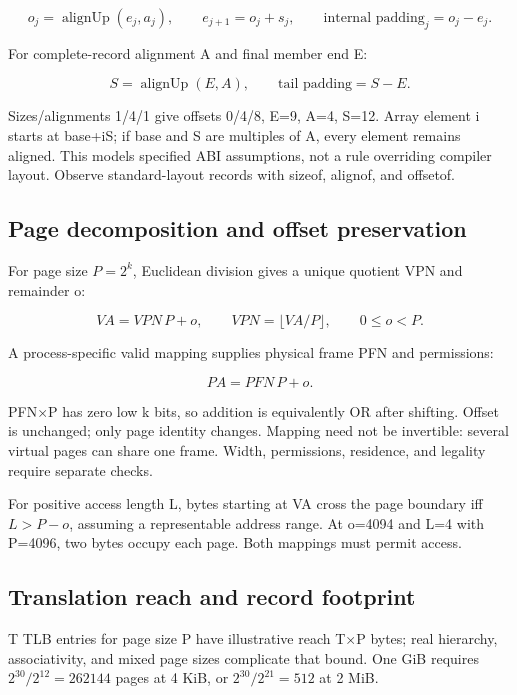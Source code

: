\[
o_j=\operatorname{alignUp}(e_j,a_j),\qquad
e_{j+1}=o_j+s_j,\qquad
\text{internal padding}_j=o_j-e_j.
\]

For complete-record alignment A and final member end E:

\[
S=\operatorname{alignUp}(E,A),\qquad
\text{tail padding}=S-E.
\]

Sizes/alignments 1/4/1 give offsets 0/4/8, E=9, A=4, S=12. Array element i starts at base+iS; if base and S are multiples of A, every element remains aligned. This models specified ABI assumptions, not a rule overriding compiler layout. Observe standard-layout records with sizeof, alignof, and offsetof.

\subsection{Page decomposition and offset preservation}\label{03-visual-computing-i-ch018-page-decomposition-and-offset-preservation}

For page size \(P=2^k\), Euclidean division gives a unique quotient VPN and remainder o:

\[
VA=VPN\,P+o,\qquad VPN=\lfloor VA/P\rfloor,\qquad 0\le o<P.
\]

A process-specific valid mapping supplies physical frame PFN and permissions:

\[
PA=PFN\,P+o.
\]

PFN×P has zero low k bits, so addition is equivalently OR after shifting. Offset is unchanged; only page identity changes. Mapping need not be invertible: several virtual pages can share one frame. Width, permissions, residence, and legality require separate checks.

For positive access length L, bytes starting at VA cross the page boundary iff \(L>P-o\), assuming a representable address range. At o=4094 and L=4 with P=4096, two bytes occupy each page. Both mappings must permit access.

\subsection{Translation reach and record footprint}\label{03-visual-computing-i-ch018-translation-reach-and-record-footprint}

T TLB entries for page size P have illustrative reach T×P bytes; real hierarchy, associativity, and mixed page sizes complicate that bound. One GiB requires \(2^{30}/2^{12}=262144\) pages at 4 KiB, or \(2^{30}/2^{21}=512\) at 2 MiB.

